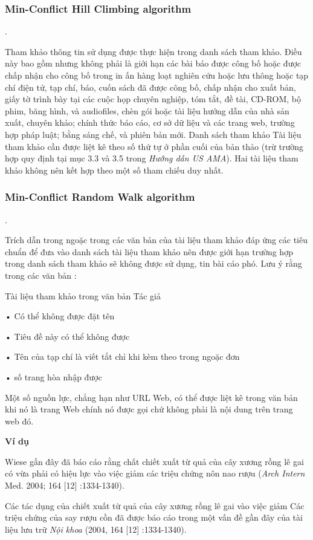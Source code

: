 \documentclass{hcmutarticle}
\begin{document}
\subsubsection{Min-Conflict Hill Climbing algorithm}.

Tham khảo thông tin sử dụng được thực hiện trong danh sách tham khảo. Điều này bao gồm nhưng không phải là giới hạn các bài báo được công bố hoặc được chấp nhận cho công bố trong in ấn hàng loạt nghiên cứu hoặc lưu thông hoặc tạp chí điện tử, tạp chí, báo, cuốn sách đã được công bố, chấp nhận cho xuất bản, giấy tờ trình bày tại các cuộc họp chuyên nghiệp, tóm tắt, đề tài, CD-ROM, bộ phim, băng hình, và audiofiles, chèn gói hoặc tài liệu hướng dẫn của nhà sản xuất, chuyên khảo; chính thức báo cáo, cơ sở dữ liệu và các trang web, trường hợp pháp luật; bằng sáng chế, và phiên bản mới. Danh sách tham khảo Tài liệu tham khảo cần được liệt kê theo số thứ tự ở phần cuối của bản thảo (trừ trường hợp quy định tại mục 3.3 và 3.5 trong {\itshape Hướng dẫn US AMA}). Hai tài liệu tham khảo không nên kết hợp theo một số tham chiếu duy nhất.

\subsubsection{Min-Conflict Random Walk algorithm}.


Trích dẫn trong ngoặc trong các văn bản của tài liệu tham khảo đáp ứng các tiêu chuẩn để đưa vào danh sách tài liệu tham khảo nên được giới hạn trường hợp trong danh sách tham khảo sẽ không được sử dụng, tin bài cáo phó. Lưu ý rằng trong các văn bản :

Tài liệu tham khảo trong văn bản Tác giả 

• Có thể không được đặt tên 

• Tiêu đề này có thể không được 

• Tên của tạp chí là viết tắt chỉ khi kèm theo trong ngoặc đơn

 • số trang hòa nhập được 
 
Một số nguồn lực, chẳng hạn như URL Web, có thể được liệt kê trong văn bản khi nó là trang Web chính nó được gọi chứ không phải là nội dung trên trang web đó.

{\bfseries Ví dụ}

Wiese gần đây đã báo cáo rằng chất chiết xuất từ quả của cây xương rồng lê gai có vừa phải có hiệu lực vào việc giảm các triệu chứng nôn nao rượu ({\itshape Arch Intern} Med. 2004; 164 [12] :1334-1340). 

Các tác dụng của chiết xuất từ quả của cây xương rồng lê gai vào việc giảm Các triệu chứng của say rượu cồn đã được báo cáo trong một vấn đề gần đây của tài liệu lưu trữ {\itshape Nội khoa} (2004, 164 [12] :1334-1340). 
\end{document}
